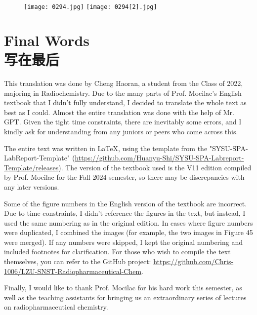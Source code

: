 \documentclass[dvipsnames, svgnames,a4paper,11pt]{article}
\begin{document}
\begin{figure}[h]
    \centering
    \texttt{[image: 0294.jpg]} \hspace{0.2in}
    \texttt{[image: 0294[2].jpg]}  
     \label{fig387}
\end{figure}


\newpage

\section{Final Words \\ 写在最后}

This translation was done by Cheng Haoran, a student from the Class of 2022, majoring in Radiochemistry. Due to the many parts of Prof. Mocilac's English textbook that I didn't fully understand, I decided to translate the whole text as best as I could. Almost the entire translation was done with the help of Mr. GPT. Given the tight time constraints, there are inevitably some errors, and I kindly ask for understanding from any juniors or peers who come across this.

The entire text was written in \LaTeX, using the template from the "SYSU-SPA-LabReport-Template" (\url{https://github.com/Huanyu-Shi/SYSU-SPA-Labreport-Template/releases}). The version of the textbook used is the V11 edition compiled by Prof. Mocilac for the Fall 2024 semester, so there may be discrepancies with any later versions.

Some of the figure numbers in the English version of the textbook are incorrect. Due to time constraints, I didn’t reference the figures in the text, but instead, I used the same numbering as in the original edition. In cases where figure numbers were duplicated, I combined the images (for example, the two images in Figure 45 were merged). If any numbers were skipped, I kept the original numbering and included footnotes for clarification. For those who wish to compile the text themselves, you can refer to the GitHub project: \url{https://github.com/Chris-1006/LZU-SNST-Radiopharmaceutical-Chem}. 

Finally, I would like to thank Prof. Mocilac for his hard work this semester, as well as the teaching assistants for bringing us an extraordinary series of lectures on radiopharmaceutical chemistry.
\end{document}
